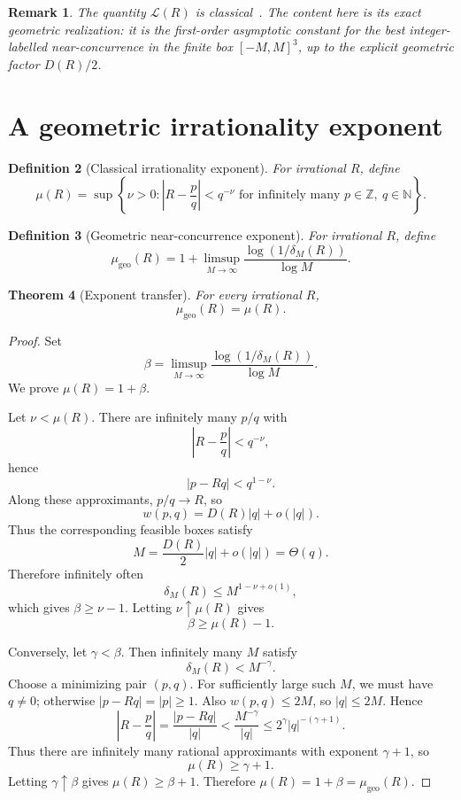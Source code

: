 \documentclass[11pt,a4paper]{article}
\newcommand{\deltam}{\delta_M}
\newtheorem{theorem}{Theorem}[section]
\newtheorem{definition}[theorem]{Definition}
\newtheorem{remark}[theorem]{Remark}
\begin{document}
\begin{remark}
The quantity $\mathcal L(R)$ is classical~\cite{cassels,schmidt1980}. The content here is its exact geometric realization:
it is the first-order asymptotic constant for the best integer-labelled near-concurrence in the
finite box $[-M,M]^3$, up to the explicit geometric factor $D(R)/2$.
\end{remark}

\section{A geometric irrationality exponent}

\begin{definition}[Classical irrationality exponent]
For irrational $R$, define
\[
\mu(R)=
\sup\left\{\nu>0:\left|R-\frac pq\right|<q^{-\nu}
\text{ for infinitely many }p\in\mathbb Z,\ q\in\mathbb N\right\}.
\]
\end{definition}

\begin{definition}[Geometric near-concurrence exponent]
For irrational $R$, define
\[
\mu_{\mathrm{geo}}(R)=1+
\limsup_{M\to\infty}\frac{\log(1/\deltam(R))}{\log M}.
\]
\end{definition}

\begin{theorem}[Exponent transfer]\label{thm:exponent}
For every irrational $R$,
\[
\boxed{\mu_{\mathrm{geo}}(R)=\mu(R).}
\]
\end{theorem}

\begin{proof}
Set
\[
\beta=
\limsup_{M\to\infty}
\frac{\log(1/\deltam(R))}{\log M}.
\]
We prove $\mu(R)=1+\beta$.

Let $\nu<\mu(R)$. There are infinitely many $p/q$ with
\[
\left|R-\frac pq\right|<q^{-\nu},
\]
hence
\[
|p-Rq|<q^{1-\nu}.
\]
Along these approximants, $p/q\to R$, so
\[
w(p,q)=D(R)|q|+o(|q|).
\]
Thus the corresponding feasible boxes satisfy
\[
M=\frac{D(R)}2|q|+o(|q|)=\Theta(q).
\]
Therefore infinitely often
\[
\deltam(R)\le M^{1-\nu+o(1)},
\]
which gives $\beta\ge\nu-1$. Letting $\nu\uparrow\mu(R)$ gives
\[
\beta\ge\mu(R)-1.
\]

Conversely, let $\gamma<\beta$. Then infinitely many $M$ satisfy
\[
\deltam(R)<M^{-\gamma}.
\]
Choose a minimizing pair $(p,q)$. For sufficiently large such $M$, we must have $q\ne0$; otherwise
$|p-Rq|=|p|\ge1$. Also $w(p,q)\le2M$, so $|q|\le2M$. Hence
\[
\left|R-\frac pq\right|
=\frac{|p-Rq|}{|q|}
<\frac{M^{-\gamma}}{|q|}
\le2^\gamma |q|^{-(\gamma+1)}.
\]
Thus there are infinitely many rational approximants with exponent $\gamma+1$, so
\[
\mu(R)\ge\gamma+1.
\]
Letting $\gamma\uparrow\beta$ gives $\mu(R)\ge\beta+1$.
Therefore $\mu(R)=1+\beta=\mu_{\mathrm{geo}}(R)$.
\end{proof}
\end{document}
